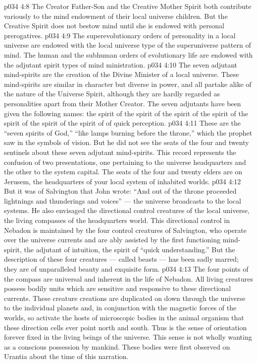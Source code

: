 \vs p034 4:8 \pc The Creator Father\hyp{}Son and the Creative Mother Spirit both contribute variously to the mind endowment of their local universe children. But the Creative Spirit does not bestow mind until she is endowed with personal prerogatives.
\vs p034 4:9 The superevolutionary orders of personality in a local universe are endowed with the local universe type of the superuniverse pattern of mind. The human and the subhuman orders of evolutionary life are endowed with the adjutant spirit types of mind ministration.
\vs p034 4:10 \pc The seven adjutant mind\hyp{}spirits are the creation of the Divine Minister of a local universe. These mind\hyp{}spirits are similar in character but diverse in power, and all partake alike of the nature of the Universe Spirit, although they are hardly regarded as personalities apart from their Mother Creator. The seven adjutants have been given the following names: the spirit of  the spirit of  the spirit of  the spirit of  the spirit of  the spirit of  the spirit of  of quick perception.
\vs p034 4:11 \pc These are the “seven spirits of God,” “like lamps burning before the throne,” which the prophet saw in the symbols of vision. But he did not see the seats of the four and twenty sentinels about these seven adjutant mind\hyp{}spirits. This record represents the confusion of two presentations, one pertaining to the universe headquarters and the other to the system capital. The seats of the four and twenty elders are on Jerusem, the headquarters of your local system of inhabited worlds.
\vs p034 4:12 But it was of Salvington that John wrote: “And out of the throne proceeded lightnings and thunderings and voices” --- the universe broadcasts to the local systems. He also envisaged the directional control creatures of the local universe, the living compasses of the headquarters world. This directional control in Nebadon is maintained by the four control creatures of Salvington, who operate over the universe currents and are ably assisted by the first functioning mind\hyp{}spirit, the adjutant of intuition, the spirit of “quick understanding.” But the description of these four creatures --- called beasts --- has been sadly marred; they are of unparalleled beauty and exquisite form.
\vs p034 4:13 The four points of the compass are universal and inherent in the life of Nebadon. All living creatures possess bodily units which are sensitive and responsive to these directional currents. These creature creations are duplicated on down through the universe to the individual planets and, in conjunction with the magnetic forces of the worlds, so activate the hosts of microscopic bodies in the animal organism that these direction cells ever point north and south. Thus is the sense of orientation forever fixed in the living beings of the universe. This sense is not wholly wanting as a conscious possession by mankind. These bodies were first observed on Urantia about the time of this narration.
